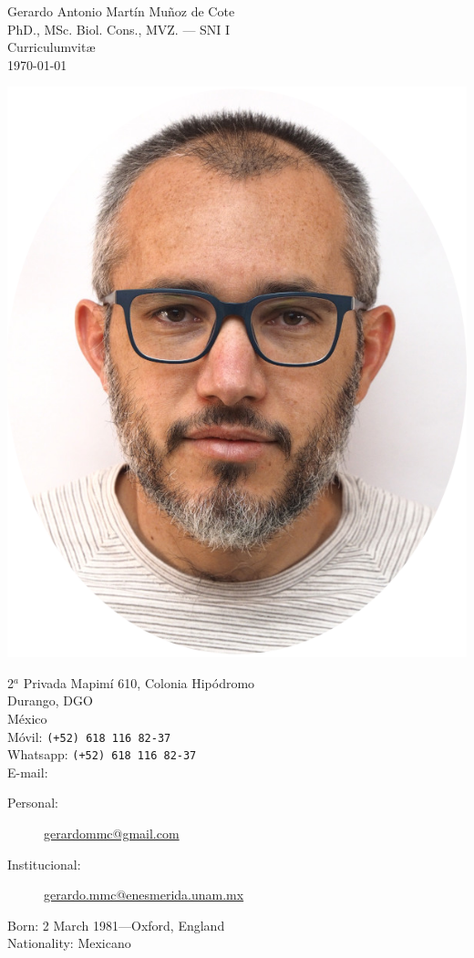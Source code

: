 \documentclass[12pt, a4paper]{article}
\begin{document}
{\LARGE Gerardo Antonio Mart\'in Mu\~noz de Cote \orcidA{}}\\ [0.5cm]
{\small PhD., MSc. Biol. Cons., MVZ. --- SNI I}\\[0.5cm]
{\large Curriculumvit\ae}\\
{\small \today}\\[0.5cm]

\begin{multicols}{2}
\begin{center}
	\includegraphics[width=.7\linewidth]{yo}
\end{center}

2$^a$ Privada Mapim\'i 610, Colonia Hip\'odromo\\
Durango, DGO\\
M\'exico\\[.2cm]
M\'ovil: \texttt{(+52) 618 116 82-37}\\
Whatsapp: \texttt{(+52) 618 116 82-37}\\
E-mail:
\begin{description}
	\item[Personal:] \href{mailto:gerardommc@gmail.com}{gerardommc@gmail.com}
	\item[Institucional:] \href{mailto:gerardo.mmc@enesmerida.unam.mx}{gerardo.mmc@enesmerida.unam.mx}
\end{description}
Born:  2 March 1981---Oxford, England\\
Nationality:  Mexicano

\end{multicols}
\end{document}
